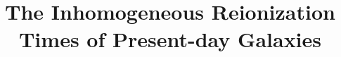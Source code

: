 \documentclass[twocolumn]{aastex61}
\begin{document}
\title{The Inhomogeneous Reionization Times of Present-day Galaxies}






\end{document}
